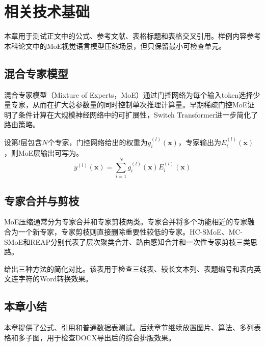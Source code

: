 \section{相关技术基础}
本章用于测试正文中的公式、参考文献、表格标题和表格交叉引用。样例内容参考本科论文中的MoE视觉语言模型压缩场景，但只保留最小可检查单元。

\subsection{混合专家模型}
混合专家模型（Mixture of Experts，MoE）通过门控网络为每个输入token选择少量专家，从而在扩大总参数量的同时控制单次推理计算量。早期稀疏门控MoE证明了条件计算在大规模神经网络中的可扩展性\cite{shazeer2017outrageously}，Switch Transformer进一步简化了路由策略\cite{fedus2022switch}。

设第$l$层包含$N$个专家，门控网络给出的权重为$g_i^{(l)}(\bm{x})$，专家输出为$E_i^{(l)}(\bm{x})$，则MoE层输出可写为。
\begin{equation}
    \label{eq:test_moe_output}
    y^{(l)}(\bm{x}) = \sum_{i=1}^{N} g_i^{(l)}(\bm{x}) E_i^{(l)}(\bm{x})
\end{equation}

\subsection{专家合并与剪枝}
MoE压缩通常分为专家合并和专家剪枝两类。专家合并将多个功能相近的专家融合为一个新专家，专家剪枝则直接删除重要性较低的专家。HC-SMoE、MC-SMoE和REAP分别代表了层次聚类合并、路由感知合并和一次性专家剪枝三类思路\cite{chi2022hcsmoe,li2024mcsmoe,chen2024reap}。

给出三种方法的简化对比。该表用于检查三线表、较长文本列、表题编号和表内英文连字符的Word转换效果。

\begin{table}[!ht]
    \centering
    \caption{三种MoE专家压缩方法对比}
    \label{chart:merge_comparison}
\end{table}

\subsection{本章小结}
本章提供了公式、引用和普通数据表测试。后续章节继续放置图片、算法、多列表格和多子图，用于检查DOCX导出后的综合排版效果。
